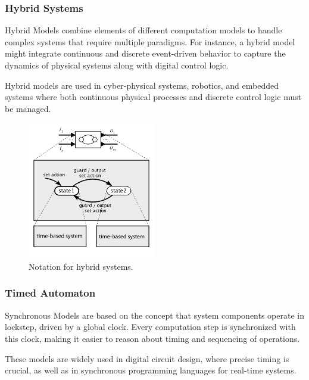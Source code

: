 \documentclass[12pt	]{article}
\begin{document}
\subsubsection{Hybrid Systems}
Hybrid Models combine elements of different computation models to handle complex systems that require multiple paradigms. For instance, a hybrid model might integrate continuous and discrete event-driven behavior to capture the dynamics of physical systems along with digital control logic.

Hybrid models are used in cyber-physical systems, robotics, and embedded systems where both continuous physical processes and discrete control logic must be managed.

\begin{figure}[h]
	\centering
	\includegraphics[width=0.5\textwidth]{Images/img4.png}
	\caption{Notation for hybrid systems.}
	\label{fig:Notation for hybrid systems.}
\end{figure}










\subsubsection{Timed Automaton}
Synchronous Models are based on the concept that system components operate in lockstep, driven by a global clock. Every computation step is synchronized with this clock, making it easier to reason about timing and sequencing of operations.

These models are widely used in digital circuit design, where precise timing is crucial, as well as in synchronous programming languages for real-time systems.
\end{document}
